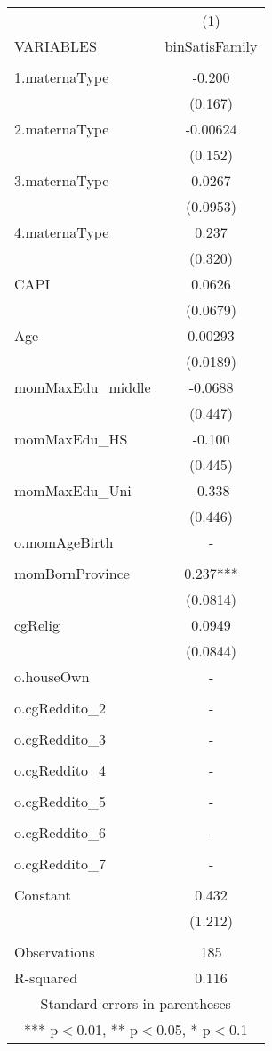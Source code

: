 \documentclass[]{article}
\begin{document}
\begin{tabular}{lc} \hline
 & (1) \\
VARIABLES & binSatisFamily \\ \hline
 &  \\
1.maternaType & -0.200 \\
 & (0.167) \\
2.maternaType & -0.00624 \\
 & (0.152) \\
3.maternaType & 0.0267 \\
 & (0.0953) \\
4.maternaType & 0.237 \\
 & (0.320) \\
CAPI & 0.0626 \\
 & (0.0679) \\
Age & 0.00293 \\
 & (0.0189) \\
momMaxEdu\_middle & -0.0688 \\
 & (0.447) \\
momMaxEdu\_HS & -0.100 \\
 & (0.445) \\
momMaxEdu\_Uni & -0.338 \\
 & (0.446) \\
o.momAgeBirth & - \\
 &  \\
momBornProvince & 0.237*** \\
 & (0.0814) \\
cgRelig & 0.0949 \\
 & (0.0844) \\
o.houseOwn & - \\
 &  \\
o.cgReddito\_2 & - \\
 &  \\
o.cgReddito\_3 & - \\
 &  \\
o.cgReddito\_4 & - \\
 &  \\
o.cgReddito\_5 & - \\
 &  \\
o.cgReddito\_6 & - \\
 &  \\
o.cgReddito\_7 & - \\
 &  \\
Constant & 0.432 \\
 & (1.212) \\
 &  \\
Observations & 185 \\
 R-squared & 0.116 \\ \hline
\multicolumn{2}{c}{ Standard errors in parentheses} \\
\multicolumn{2}{c}{ *** p$<$0.01, ** p$<$0.05, * p$<$0.1} \\
\end{tabular}
\end{document}
